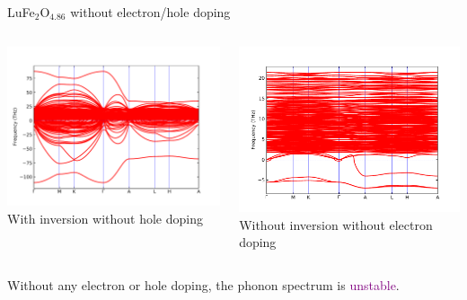 \documentclass{beamer}
\begin{document}
\begin{frame}{LuFe\(_2\)O\(_{4.86}\) without electron/hole doping}
\begin{columns}
  \begin{column}{0.5\textwidth}
    \centering
    \includegraphics[width=\textwidth]{figure/wI-e0.pdf}
    \scriptsize With inversion without hole doping
  \end{column}
  \begin{column}{0.5\textwidth}
    \centering
    \includegraphics[width=\textwidth]{figure/woI-e0.pdf}
    \scriptsize Without inversion without electron doping
  \end{column}
\end{columns}
\begin{block}{}
  Without any electron or hole doping, the phonon spectrum is \textcolor{purple}{unstable}.
\end{block}
\end{frame}
\end{document}
